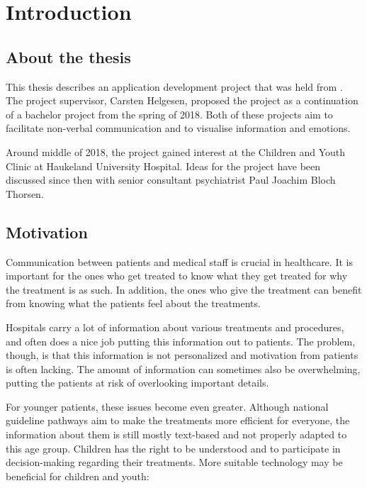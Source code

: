 \chapter{Introduction}
\label{ch:introduction}

\section{About the thesis}

This thesis describes an application development project that was held from {\printdayoff {}}. The project supervisor, Carsten Helgesen, proposed the project as a continuation of a bachelor project from the spring of 2018. Both of these projects aim to facilitate non-verbal communication and to visualise information and emotions.

Around middle of 2018, the project gained interest at the Children and Youth Clinic at Haukeland University Hospital. Ideas for the project have been discussed since then with senior consultant psychiatrist Paul Joachim Bloch Thorsen.

\section{Motivation}

Communication between patients and medical staff is crucial in healthcare. It is important for the ones who get treated to know what they get treated for why the treatment is as such. In addition, the ones who give the treatment can benefit from knowing what the patients feel about the treatments. 



Hospitals carry a lot of information about various treatments and procedures, and often does a nice job putting this information out to patients. The problem, though, is that this information is not personalized and motivation from patients is often lacking. The amount of information can sometimes also be overwhelming, putting the patients at risk of overlooking important details.


For younger patients, these issues become even greater. Although national guideline pathways aim to make the treatments more efficient for everyone, the information about them is still mostly text-based and not properly adapted to this age group. Children has the right to be understood and to participate in decision-making regarding their treatments. More suitable technology may be beneficial for children and youth:

